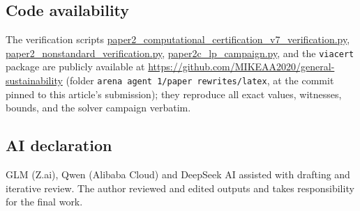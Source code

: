 \documentclass[10pt,twocolumn]{article}
\theoremstyle{plain}
\theoremstyle{definition}
\theoremstyle{remark}
\begin{document}
\subsection*{Code availability}
The verification scripts
\url{paper2_computational_certification_v7_verification.py},
\url{paper2_nonstandard_verification.py},
\url{paper2c_lp_campaign.py}, and the \texttt{viacert} package are publicly
available at \url{https://github.com/MIKEAA2020/general-sustainability}
(folder \texttt{arena agent 1/paper rewrites/latex}, at the commit
pinned to this article's submission); they reproduce all exact values,
witnesses, bounds, and the solver campaign verbatim.

\subsection*{AI declaration}
GLM (Z.ai), Qwen (Alibaba Cloud) and DeepSeek AI assisted with drafting
and iterative review. The author reviewed and edited outputs and takes
responsibility for the final work.
\end{document}

